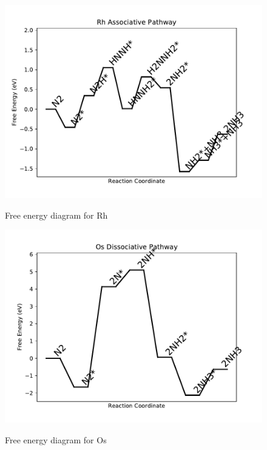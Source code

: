 \documentclass[journal=jacsat,manuscript=article]{achemso}
\begin{document}
\begin{figure}
\includegraphics[width=1\linewidth]{data/plots/Rh_associative.pdf}
\label{fig:Rh_associative}
\caption{Free energy diagram for Rh}
\end{figure}

\newpage
\begin{figure}
\includegraphics[width=1\linewidth]{data/plots/Os_dissociative.pdf}
\label{fig:Os_dissociative}
\caption{Free energy diagram for Os}
\end{figure}
\end{document}
